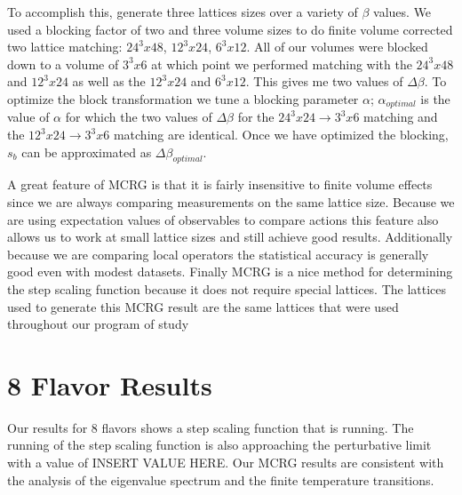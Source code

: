 \documentclass{PoS}
\begin{document}
To accomplish this, generate three lattices sizes over a variety of $\beta$ values.
We used a blocking factor of two and three volume sizes to do finite volume corrected two lattice matching: $24^3x48$, $12^3x24$, $6^3x12$.
All of our volumes were blocked down to a volume of $3^3x6$ at which point we performed matching with the $24^3x48$ and $12^3x24$ as well as the $12^3x24$ and $6^3x12$.
This gives me two values of $\Delta\beta$.
To optimize the block transformation we tune a blocking parameter $\alpha$; $\alpha_{optimal}$ is the value of $\alpha$ for which the two values of $\Delta\beta$ for the $24^3x24\to3^3x6$ matching and the $12^3x24\to3^3x6$ matching are identical.
Once we have optimized the blocking, $s_b$ can be approximated as $\Delta\beta_{optimal}$.

A great feature of MCRG is that it is fairly insensitive to finite volume effects since we are always comparing measurements on the same lattice size.
Because we are using expectation values of observables to compare actions this feature also allows us to work at small lattice sizes and still achieve good results.
Additionally because we are comparing local operators the statistical accuracy is generally good even with modest datasets.
Finally MCRG is a nice method for determining the step scaling function because it does not require special lattices.
The lattices used to generate this MCRG result are the same lattices that were used throughout our program of study

\section{8 Flavor Results}
Our results for 8 flavors shows a step scaling function that is running.
The running of the step scaling function is also approaching the perturbative limit with a value of INSERT VALUE HERE.
Our MCRG results are consistent with the analysis of the eigenvalue spectrum and the finite temperature transitions.
\end{document}
